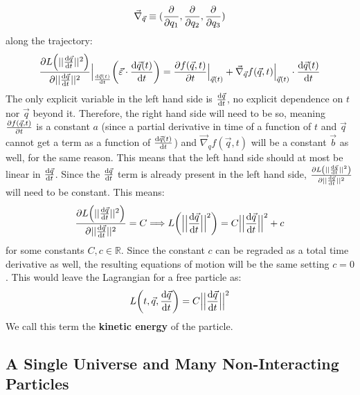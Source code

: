 \documentclass[11pt, a4paper]{article} %
\newcommand{\R}{\mathbb{R}} %
\begin{document}
\begin{equation}
\vec{\nabla}_{\vec{q}}\equiv(\pdv{}{q_1},\pdv{}{q_2}, \pdv{}{q_3})
\end{equation}
along the trajectory:
\begin{equation}
\pdv{L\qty(||\dv{\vec{q}}{t}||^2)}{||\dv{\vec{q}}{t}||^2}\Big\rvert_{\dv{\vec{q}(t)}{t}}\qty( \vec{\varepsilon}\cdot \dv{\vec{q}(t)}{t})=\pdv{f(\vec{q},t)}{t}\Big\rvert_{\vec{q}(t)}+\vec{\nabla}_{\vec{q}}f(\vec{q},t)\Big\rvert_{\vec{q}(t)}\cdot \dv{\vec{q}(t)}{t}
\end{equation}
The only explicit variable in the left hand side is $\dv{\vec{q}}{t}$, no explicit dependence on $t$ nor $\vec{q}$ beyond it. Therefore, the right hand side will need to be so, meaning $\pdv{f(\vec{q},t)}{t}$ is a constant $a$ (since a partial derivative in time of a function of $t$ and $\vec{q}$ cannot get a term as a function of $\dv{\vec{q}(t)}{t}$) and $\vec{\nabla}_qf(\vec{q},t)$ will be a constant $\vec{b}$ as well, for the same reason. This means that the left hand side should at most be linear in $\dv{\vec{q}}{t}$. Since the $\dv{\vec{q}}{t}$ term is already present in the left hand side, $\pdv{L\qty(||\dv{\vec{q}}{t}||^2)}{||\dv{\vec{q}}{t}||^2}$ will need to be constant. This means:
\begin{equation}
\pdv{L\qty(||\dv{\vec{q}}{t}||^2)}{||\dv{\vec{q}}{t}||^2}=C \Longrightarrow L\qty(\Big|\Big|\dv{\vec{q}}{t}\Big|\Big|^2) = C\Big|\Big|\dv{\vec{q}}{t}\Big|\Big|^2+c
\end{equation}
for some constants $C,c\in\R$. Since the constant $c$ can be regraded as a total time derivative as well, the resulting equations of motion will be the same setting $c=0$. This would leave the Lagrangian for a free particle as:
\begin{equation}
L\qty(t, \vec{q}, \dv{\vec{q}}{t})=C\Big|\Big|\dv{\vec{q}}{t}\Big|\Big|^2
\end{equation}
We call this term the {\bf kinetic energy} of the particle.

\subsection*{A Single Universe and Many Non-Interacting Particles}
\end{document}
